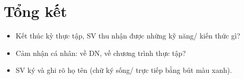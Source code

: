 \documentclass[a4paper]{article}
\theoremstyle{definition}
\begin{document}




\newpage
\section{Tổng kết}
\begin{itemize}
    \item Kết thúc kỳ thực tập, SV thu nhận được những kỹ năng/ kiến thức gì?
    \item Cảm nhận cá nhân: về DN, về chương trình thực tập?
    \item SV ký và ghi rõ họ tên (chữ ký sống/ trực tiếp bằng bút màu xanh).
\end{itemize}

\end{document}

